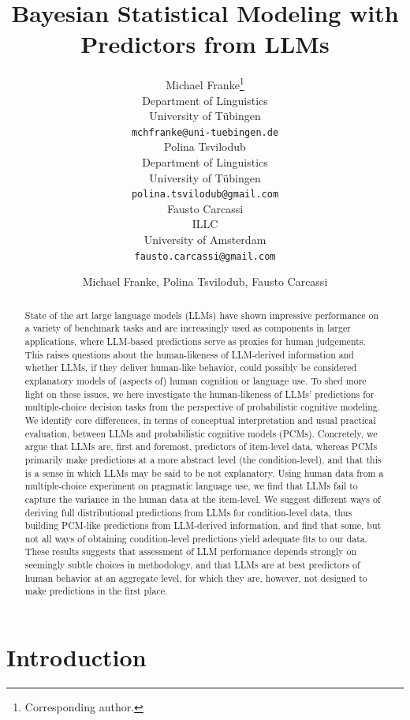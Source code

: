 \documentclass[fleqn]{article}
\title{Bayesian Statistical Modeling with Predictors from LLMs}
\date{}
\author{ Michael Franke\thanks{Corresponding author.} \\
	Department of Linguistics\\
	University of Tübingen\\
	\texttt{mchfranke@uni-tuebingen.de} \\
	\And
	Polina Tsvilodub \\
	Department of Linguistics\\
	University of Tübingen\\
	\texttt{polina.tsvilodub@gmail.com} \\
	\And
	Fausto Carcassi \\
	ILLC\\
	University of Amsterdam\\
	\texttt{fausto.carcassi@gmail.com} \\
}
\author{Michael Franke, Polina Tsvilodub, Fausto Carcassi}
\affil{Department of Linguistics\\University of Tübingen\\
\texttt{[michael.franke|polina.tsvilodub|fausto.carcassi]@uni-tuebingen.de}}
\begin{document}
\maketitle

\begin{abstract}
  State of the art large language models (LLMs) have shown impressive performance on a variety of benchmark tasks and are increasingly used as components in larger applications, where LLM-based predictions serve as proxies for human judgements.
  This raises questions about the human-likeness of LLM-derived information and whether LLMs, if they deliver human-like behavior, could possibly be considered explanatory models of (aspects of) human cognition or language use.
  To shed more light on these issues, we here investigate the human-likeness of LLMs' predictions for multiple-choice decision tasks from the perspective of probabilistic cognitive modeling.
  We identify core differences, in terms of conceptual interpretation and usual practical evaluation, between LLMs and probabilistic cognitive models (PCMs).
  Concretely, we argue that LLMs are, first and foremost, predictors of item-level data, whereas PCMs primarily make predictions at a more abstract level (the condition-level), and that this is a sense in which LLMs may be said to be not explanatory.
  Using human data from a multiple-choice experiment on pragmatic language use, we find that LLMs fail to capture the variance in the human data at the item-level.
  We suggest different ways of deriving full distributional predictions from LLMs for condition-level data, thus building PCM-like predictions from LLM-derived information, and find that some, but not all ways of obtaining condition-level predictions yield adequate fits to our data.
  These results suggests that assessment of LLM performance depends strongly on seemingly subtle choices in methodology, and that LLMs are at best predictors of human behavior at an aggregate level, for which they are, however, not designed to make predictions in the first place.
\end{abstract}



\section{Introduction}
\label{sec:introduction}
\end{document}
